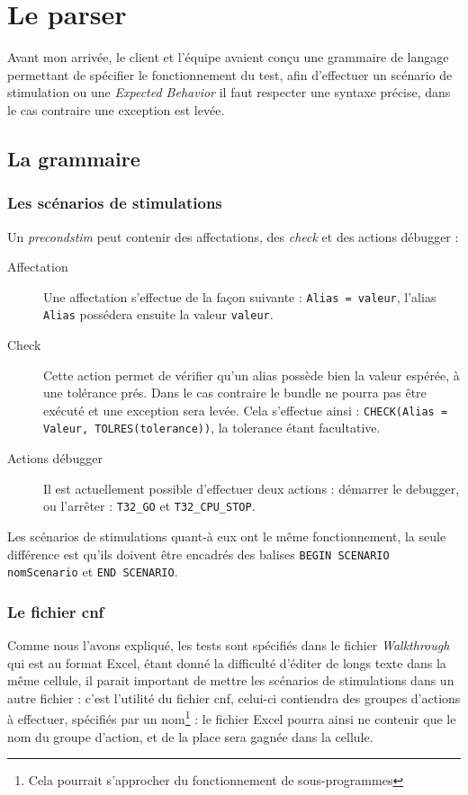 	\section{Le parser}\label{sectionParser}
	Avant mon arrivée, le client et l'équipe avaient conçu une grammaire de langage permettant de spécifier le fonctionnement du test, afin d'effectuer un scénario de stimulation ou une \textit{Expected Behavior} il faut respecter une syntaxe précise, dans le cas contraire une exception est levée.

	\subsection{La grammaire}\label{specParser}
	\subsubsection{Les scénarios de stimulations}
	Un \textit{precondstim} peut contenir des affectations, des \textit{check} et des actions débugger : 
	\begin{description}
		\item[Affectation] Une affectation s'effectue de la façon suivante : \texttt{Alias = valeur}, l'alias \texttt{Alias} possédera ensuite la valeur \texttt{valeur}.
		\item[Check] Cette action permet de vérifier qu'un alias possède bien la valeur espérée, à une tolérance prés. Dans le cas contraire le bundle ne pourra pas être exécuté et une exception sera levée. Cela s'effectue ainsi : \texttt{CHECK(Alias = Valeur, TOLRES(tolerance))}, la tolerance étant facultative.
		\item[Actions débugger] Il est actuellement possible d'effectuer deux actions : démarrer le debugger, ou l'arrêter : \texttt{T32\_GO} et 
		\texttt{T32\_CPU\_STOP}.
	\end{description}

	Les scénarios de stimulations quant-à eux ont le même fonctionnement, la seule différence est qu'ils doivent être encadrés des balises \texttt{BEGIN SCENARIO nomScenario} et \texttt{END SCENARIO}.

	\subsubsection{Le fichier cnf}
	Comme nous l'avons expliqué, les tests sont spécifiés dans le fichier \textit{Walkthrough} qui est au format Excel, étant donné la difficulté d'éditer de longs texte dans la même cellule, il parait important de mettre les scénarios de stimulations dans un autre fichier : c'est l'utilité du fichier cnf, celui-ci contiendra des groupes d'actions à effectuer, spécifiés par un nom\footnote{Cela pourrait s'approcher du fonctionnement de sous-programmes} : le fichier Excel pourra ainsi ne contenir que le nom du groupe d'action, et de la place sera gagnée dans la cellule.

